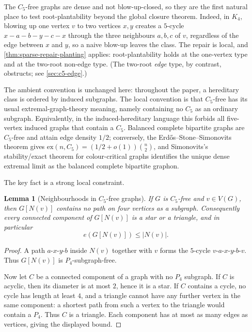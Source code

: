 \documentclass[11pt]{article}
\newtheorem{lemma}[lemma]{Lemma}
\theoremstyle{definition}
\begin{document}
The $C_5$-free graphs are dense and not blow-up-closed, so they are the first natural place to
test root-plantability beyond the global closure theorem.  Indeed, in $K_4$, blowing up one
vertex $v$ to two vertices $x,y$ creates a $5$-cycle $x-a-b-y-c-x$ through the three neighbours
$a,b,c$ of $v$, regardless of the edge between $x$ and $y$, so a naive blow-up leaves the class.
The repair is local, and \cref{thm:sparse-repair-planting} applies: root-plantability holds at the
one-vertex type and at the two-root non-edge type.  (The two-root \emph{edge} type, by contrast,
obstructs; see \cref{sec:c5-edge}.)

The ambient convention is unchanged here: throughout the paper, a hereditary class is ordered by
induced subgraphs.  The local convention is that $C_5$-free has its usual extremal-graph-theory
meaning, namely containing no $C_5$ as an ordinary subgraph.  Equivalently, in the
induced-hereditary language this forbids all five-vertex induced graphs that contain a $C_5$.
Balanced complete bipartite graphs are $C_5$-free and attain edge density $1/2$; conversely, the
Erd\H{o}s--Stone--Simonovits theorem
\cite{ErdosStone,ErdosSimonovits} gives $\mathrm{ex}(n,C_5)=(1/2+o(1))\binom n2$, and Simonovits's
stability/exact theorem for colour-critical graphs \cite{Simonovits1968} identifies the unique
dense extremal limit as the balanced complete bipartite graphon.

The key fact is a strong local constraint.

\begin{lemma}[Neighbourhoods in $C_5$-free graphs]\label{lem:c5-nbhd}
If $G$ is $C_5$-free and $v\in V(G)$, then $G[N(v)]$ contains no path on four
vertices as a subgraph.  Consequently every connected component of $G[N(v)]$ is
a star or a triangle, and in particular
\[
  e(G[N(v)])\le |N(v)|.
\]
\end{lemma}

\begin{proof}
A path $a$-$x$-$y$-$b$ inside $N(v)$ together with $v$ forms the $5$-cycle
$v$-$a$-$x$-$y$-$b$-$v$.  Thus $G[N(v)]$ is $P_4$-subgraph-free.

Now let $C$ be a connected component of a graph with no $P_4$ subgraph.  If $C$
is acyclic, then its diameter is at most $2$, hence it is a star.  If $C$
contains a cycle, no cycle has length at least $4$, and a triangle cannot have
any further vertex in the same component: a shortest path from such a vertex to
the triangle would contain a $P_4$.  Thus $C$ is a triangle.  Each component has
at most as many edges as vertices, giving the displayed bound.
\end{proof}
\end{document}
